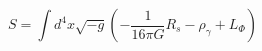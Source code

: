 \begin{equation}\label{action}
S=\int d^{4}x\sqrt{-g}(-\frac{1}{16\pi
G}R_{s}-\rho_{\gamma}+L_{\Phi})
\end{equation}

